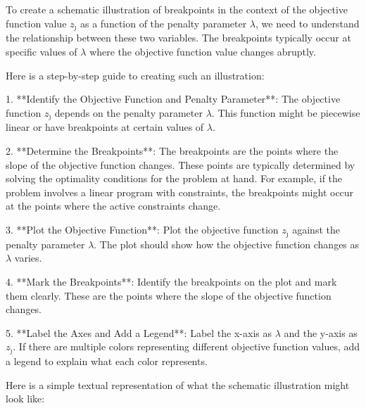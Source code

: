 To create a schematic illustration of breakpoints in the context of the objective function value \( z_{\hat{\jmath}} \) as a function of the penalty parameter \(\lambda\), we need to understand the relationship between these two variables. The breakpoints typically occur at specific values of \(\lambda\) where the objective function value changes abruptly.

Here is a step-by-step guide to creating such an illustration:

1. **Identify the Objective Function and Penalty Parameter**: The objective function \( z_{\hat{\jmath}} \) depends on the penalty parameter \(\lambda\). This function might be piecewise linear or have breakpoints at certain values of \(\lambda\).

2. **Determine the Breakpoints**: The breakpoints are the points where the slope of the objective function changes. These points are typically determined by solving the optimality conditions for the problem at hand. For example, if the problem involves a linear program with constraints, the breakpoints might occur at the points where the active constraints change.

3. **Plot the Objective Function**: Plot the objective function \( z_{\hat{\jmath}} \) against the penalty parameter \(\lambda\). The plot should show how the objective function changes as \(\lambda\) varies.

4. **Mark the Breakpoints**: Identify the breakpoints on the plot and mark them clearly. These are the points where the slope of the objective function changes.

5. **Label the Axes and Add a Legend**: Label the x-axis as \(\lambda\) and the y-axis as \( z_{\hat{\jmath}} \). If there are multiple colors representing different objective function values, add a legend to explain what each color represents.

Here is a simple textual representation of what the schematic illustration might look like:


